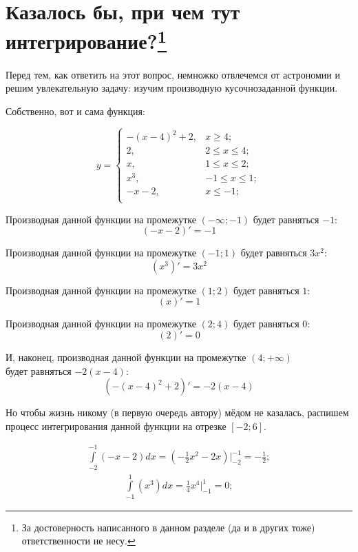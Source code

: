 \documentclass{article}
\begin{document}
	\section[Казалось бы, при чем тут интегрирование?]{Казалось бы, при чем тут интегрирование?\footnote{За достоверность написанного в данном разделе (да и в других тоже) ответственности не несу.}}
    Перед тем, как ответить на этот вопрос, немножко отвлечемся от астрономии и решим увлекательную задачу: изучим производную кусочнозаданной функции. \par 
    Собственно, вот и сама функция: \par 
    \begin{equation}
    	y = \begin{cases}
    		-(x-4)^2+2, & x \geqslant 4;\\
    		2, & 2 \leqslant x \leqslant 4;\\
    		x, & 1 \leqslant x \leqslant 2;\\
    		x^3, & -1 \leqslant x \leqslant 1;\\
    		-x-2, & x \leqslant -1;\\	
    	\end{cases}
    \end{equation} \par
    Производная данной функции на промежутке $(-\infty;-1) $ будет равняться $-1$: $$ (-x-2)' = -1$$ \par
    Производная данной функции на промежутке $(-1;1) $ будет равняться $3x^2$: $$ (x^3)' = 3x^2$$ \par
    Производная данной функции на промежутке $(1;2) $ будет равняться $1$: $$ (x)' = 1$$ \par
    Производная данной функции на промежутке $(2;4) $ будет равняться $0$: $$ (2)' = 0$$ \par
    И, наконец, производная данной функции на промежутке $(4;+\infty) $ \\будет равняться $-2(x-4)$: $$ (-(x-4)^2+2)' = -2(x-4)$$ \par
    Но чтобы жизнь никому (в первую очередь автору) мёдом не казалась, распишем процесс интегрирования данной функции на отрезке $[-2;6]$. \par 
    \begin{equation}
    \begin{split}
    	\int\limits_{-2}^{-1} (-x-2)dx =(-\frac{1}{2}x^2-2x)\big|_{-2}^{-1} = -\frac{1}{2};
    \end{split}
    \end{equation}
    \begin{equation}
    \begin{split}
    	\int\limits_{-1}^{1} (x^3)dx = \frac{1}{4}x^4\big|_{-1}^{1} = 0;
    \end{split}
    \end{equation}
\end{document}
